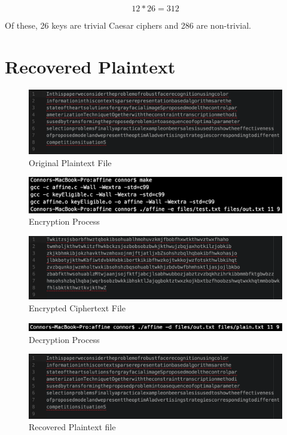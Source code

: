 \documentclass[]{article}
\begin{document}
$$12*26=312$$

Of these, 26 keys are trivial Caesar ciphers and 286 are non-trivial.

\section*{Recovered Plaintext}

\begin{figure}[H]
	\includegraphics[width=\textwidth]{affine_plaintext.png}
	\caption{Original Plaintext File}
	\centering
\end{figure}

\begin{figure}[H]
	\includegraphics[width=\textwidth]{affine_encrypt.png}
	\caption{Encryption Process}
	\centering
\end{figure}

\begin{figure}[H]
	\includegraphics[width=\textwidth]{affine_ciphertext.png}
	\caption{Encrypted Ciphertext File}
	\centering
\end{figure}

\begin{figure}[H]
	\includegraphics[width=\textwidth]{affine_decrypt.png}
	\caption{Decryption Process}
	\centering
\end{figure}

\begin{figure}[H]
	\includegraphics[width=\textwidth]{affine_plaintext.png}
	\caption{Recovered Plaintext file}
	\centering
\end{figure}
\end{document}
